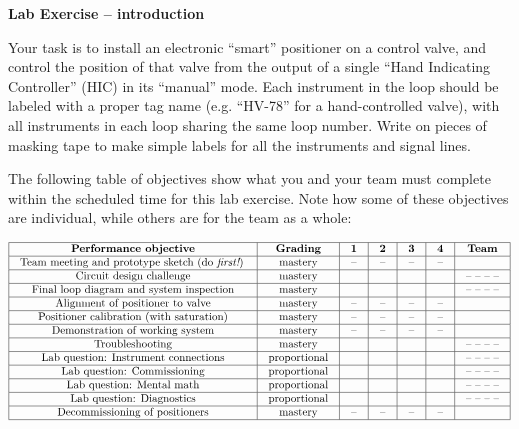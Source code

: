 

\noindent
{\bf Lab Exercise -- introduction}

\vskip 5pt

Your task is to install an electronic ``smart'' positioner on a control valve, and control the position of that valve from the output of a single ``Hand Indicating Controller'' (HIC) in its ``manual'' mode.  Each instrument in the loop should be labeled with a proper tag name (e.g. ``HV-78'' for a hand-controlled valve), with all instruments in each loop sharing the same loop number.  Write on pieces of masking tape to make simple labels for all the instruments and signal lines.

The following table of objectives show what you and your team must complete within the scheduled time for this lab exercise.  Note how some of these objectives are individual, while others are for the team as a whole:



$$\vbox{\offinterlineskip
\halign{\strut
\vrule \quad\hfil # \ \hfil & 
\vrule \quad\hfil # \ \hfil & 
\vrule \quad\hfil # \ \hfil & 
\vrule \quad\hfil # \ \hfil & 
\vrule \quad\hfil # \ \hfil & 
\vrule \quad\hfil # \ \hfil & 
\vrule \quad\hfil # \ \hfil \vrule \cr
\noalign{\hrule}
%
{\bf Performance objective} & {\bf Grading} & {\bf 1} & {\bf 2} & {\bf 3} & {\bf 4} & {\bf Team} \cr
%
\noalign{\hrule}
%
Team meeting and prototype sketch (do {\it first!}) & mastery & -- & -- & -- & -- & \cr
%
\noalign{\hrule}
%
Circuit design challenge & mastery & & & & & -- -- -- -- \cr
%
\noalign{\hrule}
%
Final loop diagram and system inspection & mastery & & & & & -- -- -- -- \cr
%
\noalign{\hrule}
%
Alignment of positioner to valve & mastery & -- & -- & -- & -- & \cr
%
\noalign{\hrule}
%
Positioner calibration (with saturation) & mastery & -- & -- & -- & -- &  \cr
%
\noalign{\hrule}
%
Demonstration of working system & mastery & -- & -- & -- & -- & \cr
%
\noalign{\hrule}
%
Troubleshooting & mastery & & & & & -- -- -- -- \cr
%
\noalign{\hrule}
%
Lab question: Instrument connections & proportional &  &  &  &  & -- -- -- -- \cr
%
\noalign{\hrule}
%
Lab question: Commissioning & proportional &  &  &  &  & -- -- -- -- \cr
%
\noalign{\hrule}
%
Lab question: Mental math & proportional &  &  &  &  & -- -- -- -- \cr
%
\noalign{\hrule}
%
Lab question: Diagnostics & proportional &  &  &  &  & -- -- -- -- \cr
%
\noalign{\hrule}
%
Decommissioning of positioners & mastery & -- & -- & -- & -- &  \cr
%
\noalign{\hrule}
} %
}$$ %

